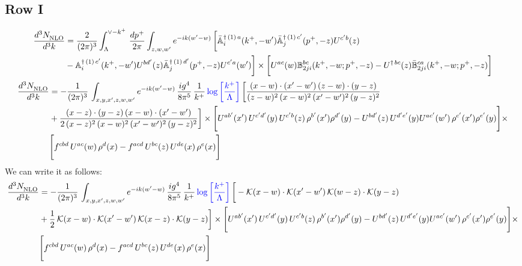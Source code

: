 \documentclass[9pt]{article}
\def\mf#1{\mathbb{#1}}
\numberwithin{equation}{section}
\begin{document}
\subsection{Row I}
\begin{align}
 \frac{d^{3}N_{\rm NLO}^{\rm}}{d^{3}k}  & =    \frac{2}{(2\pi)^{3}} \int_{\Lambda}^{\vee - k^{+}}\, \frac{dp^{+}}{2\pi}\int_{z,w,w^{\prime}} e^{-ik(w^{\prime}-w)}\, 
        \bigg[\Bar{\mf{A}}^{\dagger\, (1)\, a}_{i}(k^{+},-w^{\prime})\Bar{\mf{A}}^{\dagger\, (1)\, c^{\prime}}_{j}(p^{+},-z)U^{c^{\prime}b}(z)\notag \\ & -\mf{A}^{\dagger\, (1)\, c^{\prime}}_{i}(k^{+},- w^{\prime})U^{bd^{\prime}}(z)\Bar{\mf{A}}^{\dagger\, (1)\, d^{\prime}}_{j}(p^{+},-z)U^{c^{\prime}a}(w^{\prime})  \bigg]\times \bigg[U^{ac}(w) \mf{B}^{bc}_{2ji}(k^{+},-w;p^{+},-z) -U^{\dagger\, bc}(z)\Bar{\mf{B}}^{ca}_{2ji}(k^{+},-w; p^{+},-z)\bigg] \nonumber
\end{align}
\begin{align}
    \frac{d^{3}N_{\rm NLO}^{\rm}}{d^{3}k}  & = -\frac{1}{(2\pi)^{3}}\, \int_{x,y,x',z,w,w^{\prime}} e^{-ik(w^{\prime}-w)}\,\frac{ig^{4}}{8\pi^{5}}\,\frac{1}{k^{+}}\,{\color{blue}\log{\left[\frac{k^{+}}{\Lambda}\right]}}\,\bigg[\frac{(x-w)\cdot (x'-w')\,(z-w)\cdot (y-z)}{(z-w)^{2}\,(x-w)^{2}\,(x'-w')^{2}\,(y-z)^{2}}\notag \\ & +\frac{(x-z)\cdot (y-z)\,(x-w)\cdot (x'-w')}{2\,(x-z)^{2}\, (x-w)^{2}\,(x'-w')^{2}\,(y-z)^{2}}\bigg]\times  \Bigg[U^{ab'}(x')\,U^{c'd'}(y)\,U^{c'b}(z)\,\rho^{b'}(x')\rho^{d'}(y)-U^{bd'}(z)\,U^{d'e'}(y)U^{ac'}(w')\,\rho^{c'}(x')\rho^{e'}(y)\Bigg]\times\notag \\ & \Bigg[f^{cbd}\,U^{ac}(w)\,\rho^{d}(x)-f^{acd}\, U^{bc}(z)\,U^{de}(x)\,\rho^{e}(x)\Bigg] 
\end{align}
We can write it as follows: 
\begin{align}
    \frac{d^{3}N_{\rm NLO}^{\rm}}{d^{3}k}  & = -\frac{1}{(2\pi)^{3}}\, \int_{x,y,x',z,w,w^{\prime}} e^{-ik(w^{\prime}-w)}\,\frac{ig^{4}}{8\pi^{5}}\,\frac{1}{k^{+}}\,{\color{blue}\log{\left[\frac{k^{+}}{\Lambda}\right]}}\,\bigg[-\mathcal{K}(x-w)\cdot \mathcal{K}(x'-w')\, \mathcal{K}(w-z)\cdot \mathcal{K}(y-z)\notag \\ & +\frac{1}{2}\,\mathcal{K}(x-w)\cdot \mathcal{K}(x'-w')\, \mathcal{K}(x-z)\cdot \mathcal{K}(y-z)\bigg]\times  \Bigg[U^{ab'}(x')\,U^{c'd'}(y)\,U^{c'b}(z)\,\rho^{b'}(x')\rho^{d'}(y)-U^{bd'}(z)\,U^{d'e'}(y)U^{ac'}(w')\,\rho^{c'}(x')\rho^{e'}(y)\Bigg]\times\notag \\ & \Bigg[f^{cbd}\,U^{ac}(w)\,\rho^{d}(x)-f^{acd}\, U^{bc}(z)\,U^{de}(x)\,\rho^{e}(x)\Bigg] 
\end{align}
\end{document}
